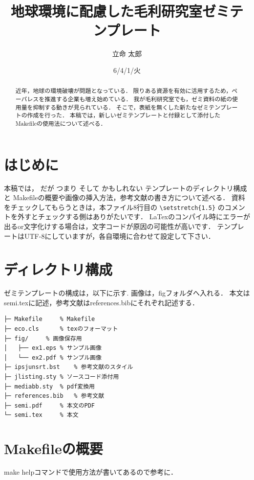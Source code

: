 \documentclass[submit,techreq,noauthor]{eco}	%
\begin{document}
\date   {6/4/1/火}				%
\title  {地球環境に配慮した毛利研究室ゼミテンプレート}	%
\author {立命 太郎}				%


\begin{abstract}
	近年，地球の環境破壊が問題となっている．
	限りある資源を有効に活用するため，ペーパレスを推進する企業も増え始めている．
	我が毛利研究室でも，ゼミ資料の紙の使用量を抑制する動きが見られている．
	そこで，表紙を無くした新たなゼミテンプレートの作成を行った．
	本稿では，新しいゼミテンプレートと付録として添付したMakefileの使用法について述べる．
\end{abstract}
\maketitle

\section{はじめに}
本稿では，
だが
つまり
そして
かもしれない
テンプレートのディレクトリ構成と
Makefileの概要や画像の挿入方法，参考文献の書き方について述べる．
資料をチェックしてもらうときは，本ファイル8行目の
\verb|\setstretch{1.5}|
のコメントを外すとチェックする側はありがたいです．
LaTexのコンパイル時にエラーが出るor文字化けする場合は，文字コードが原因の可能性が高いです．
テンプレートはUTF-8にしていますが，各自環境に合わせて設定して下さい．


\section{ディレクトリ構成}
ゼミテンプレートの構成は，以下に示す.
画像は，figフォルダへ入れる．
本文はsemi.texに記述，参考文献はreferences.bibにそれぞれ記述する．

\begin{lstlisting}
├─ Makefile		% Makefile
├─ eco.cls		% texのフォーマット
├─ fig/		% 画像保存用
│   ├── ex1.eps	% サンプル画像
│   └── ex2.pdf	% サンプル画像
├─ ipsjunsrt.bst	% 参考文献のスタイル
├─ jlisting.sty	% ソースコード添付用
├─ mediabb.sty 	% pdf変換用
├─ references.bib	% 参考文献
├─ semi.pdf		% 本文のPDF
└─ semi.tex		% 本文
\end{lstlisting}

\section{Makefileの概要}
make helpコマンドで使用方法が書いてあるので参考に．
\end{document}
